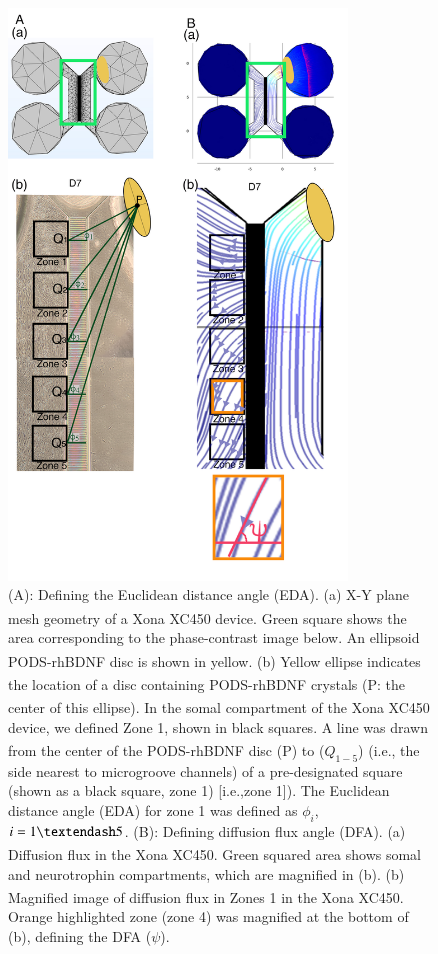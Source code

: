 \documentclass[review]{elsarticle}
\begin{document}
\begin{figure}
	\begin{center}
		\includegraphics[width=9cm]{Fig_8.jpg}
	\end{center}
	\caption{(A): Defining the Euclidean distance angle (EDA). (a) X-Y plane mesh geometry of a Xona\textsuperscript{\texttrademark} XC450 device. Green square shows the area corresponding to the phase-contrast image below. An ellipsoid PODS\textsuperscript{\textregistered}-rhBDNF disc is shown in yellow. (b) Yellow ellipse indicates the location of a disc containing PODS\textsuperscript{\textregistered}-rhBDNF crystals (P: the center of this ellipse). In the somal compartment of the Xona\textsuperscript{\texttrademark} XC450 device, we defined Zone 1, shown in black squares. A line was drawn from the center of the PODS\textsuperscript{\textregistered}-rhBDNF disc (P) to ($Q_{1-5}$) (i.e., the side nearest to microgroove channels) of a pre-designated square (shown as a black square, zone 1) [i.e.,zone 1]). The Euclidean distance angle (EDA) for zone 1 was defined as $\phi_{i}$, $i = 1\textendash 5$. (B): Defining diffusion flux angle (DFA). (a) Diffusion flux in the Xona\textsuperscript{\texttrademark} XC450. Green squared area shows somal and neurotrophin compartments, which are magnified in (b). (b) Magnified image of diffusion flux in Zones 1 in the Xona\textsuperscript{\texttrademark} XC450. Orange highlighted zone (zone 4) was magnified at the bottom of (b), defining the DFA ($\psi$).}
\end{figure}
\end{document}
